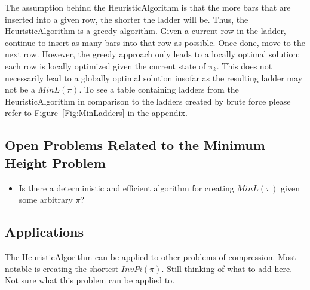The assumption behind the {\sc HeuristicAlgorithm} is that the more bars that are 
inserted into a given row, the shorter the ladder will be. Thus, the {\sc HeuristicAlgorithm} is 
a greedy algorithm. Given a 
current row in the ladder, continue to insert as many bars into that row as possible.
Once done, move to the next row. However, the greedy approach only leads 
to a locally optimal solution; each row is locally optimized given the current state 
of $\pi_{k}$. This does not necessarily lead to a globally optimal solution insofar as 
the resulting ladder may not be a $MinL(\pi)$. To see a table containing ladders from the {\sc HeuristicAlgorithm}
in comparison to the ladders created by brute force please refer to Figure~\ref{Fig:MinLadders} in the appendix.

\subsection{Open Problems Related to the Minimum Height Problem}
\begin{itemize}
    \item Is there a deterministic and efficient algorithm for creating $MinL(\pi)$ given some arbitrary $\pi$?
\end{itemize}
\subsection{Applications}
The {\sc HeuristicAlgorithm} can be applied to other problems of compression. Most notable is creating the 
shortest $InvPi(\pi)$. Still thinking of what to add here. Not sure what this problem can be applied to.
